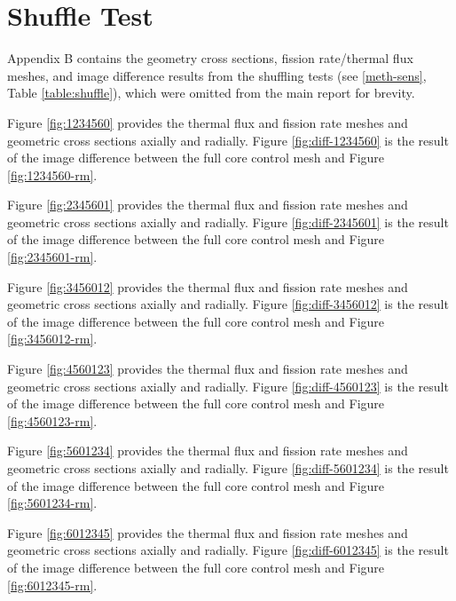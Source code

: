 \section{Shuffle Test}
\label{app-shuf}
Appendix B contains the geometry cross sections, fission rate/thermal flux meshes, and image difference results from the shuffling tests (see \autoref{meth-sens}, Table \ref{table:shuffle}), which were omitted from the main report for brevity.





Figure \ref{fig:1234560} provides the thermal flux and fission rate meshes and geometric cross sections axially and radially.  Figure \ref{fig:diff-1234560} is the result of the image difference between the full core control mesh and Figure \ref{fig:1234560-rm}.




Figure \ref{fig:2345601} provides the thermal flux and fission rate meshes and geometric cross sections axially and radially.  Figure \ref{fig:diff-2345601} is the result of the image difference between the full core control mesh and Figure \ref{fig:2345601-rm}.




Figure \ref{fig:3456012} provides the thermal flux and fission rate meshes and geometric cross sections axially and radially.  Figure \ref{fig:diff-3456012} is the result of the image difference between the full core control mesh and Figure \ref{fig:3456012-rm}.




Figure \ref{fig:4560123} provides the thermal flux and fission rate meshes and geometric cross sections axially and radially.  Figure \ref{fig:diff-4560123} is the result of the image difference between the full core control mesh and Figure \ref{fig:4560123-rm}.




Figure \ref{fig:5601234} provides the thermal flux and fission rate meshes and geometric cross sections axially and radially.  Figure \ref{fig:diff-5601234} is the result of the image difference between the full core control mesh and Figure \ref{fig:5601234-rm}.




Figure \ref{fig:6012345} provides the thermal flux and fission rate meshes and geometric cross sections axially and radially.  Figure \ref{fig:diff-6012345} is the result of the image difference between the full core control mesh and Figure \ref{fig:6012345-rm}.

